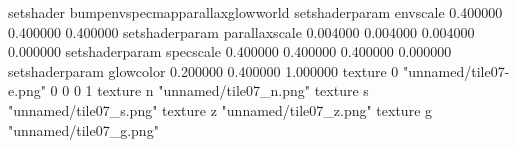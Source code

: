 setshader bumpenvspecmapparallaxglowworld
setshaderparam envscale 0.400000 0.400000 0.400000
setshaderparam parallaxscale 0.004000 0.004000 0.004000 0.000000
setshaderparam specscale 0.400000 0.400000 0.400000 0.000000
setshaderparam glowcolor 0.200000 0.400000 1.000000
texture 0 "unnamed/tile07-e.png" 0 0 0 1
texture n "unnamed/tile07_n.png"
texture s "unnamed/tile07_s.png"
texture z "unnamed/tile07_z.png"
texture g "unnamed/tile07_g.png"